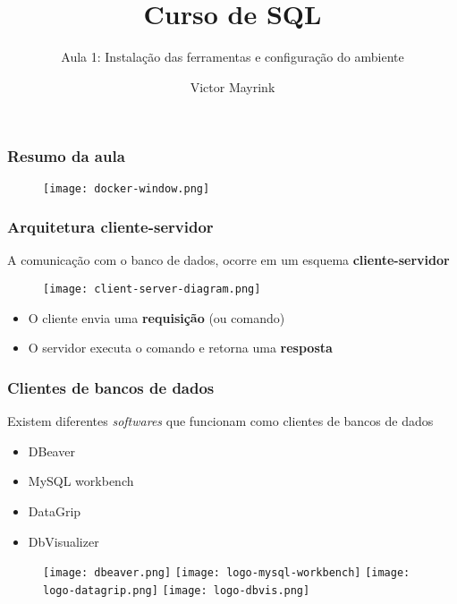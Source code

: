 \documentclass[t, 10pt, aspectratio=169, table, x11names]{beamer}
\begin{document}
	\author{Victor Mayrink}
	\title{Curso de SQL}
	\subtitle{Aula 1: Instalação das ferramentas e configuração do ambiente}

	\begin{frame}[plain]
		\maketitle
	\end{frame}
	
	\begin{frame}
		\frametitle{Resumo da aula}
		\vspace{0.5cm}
		\begin{figure}[h]
			\texttt{[image: docker-window.png]}
		\end{figure}
	\end{frame}

	\begin{frame}
		\frametitle{Arquitetura cliente-servidor}
		A comunicação com o banco de dados, ocorre em um esquema \textbf{cliente-servidor}
		\vspace{3mm}
		\begin{figure}[h]
			\texttt{[image: client-server-diagram.png]}
		\end{figure}
		\begin{itemize}
			\item O cliente envia uma \textbf{requisição} (ou comando)
			\item O servidor executa o comando e retorna uma \textbf{resposta}
		\end{itemize}
	\end{frame}
	
	\begin{frame}
		\frametitle{Clientes de bancos de dados}
		Existem diferentes \textit{softwares} que funcionam como clientes de bancos de dados
		\medskip
		\begin{itemize}
			\item DBeaver
			\item MySQL workbench
			\item DataGrip
			\item DbVisualizer
		\end{itemize}
		\begin{figure}
			\vspace{2mm}
			\centering
			\texttt{[image: dbeaver.png]}
			\hspace{10mm}
			\texttt{[image: logo-mysql-workbench]}
			\hspace{10mm}
			\texttt{[image: logo-datagrip.png]}
			\hspace{7mm}
			\texttt{[image: logo-dbvis.png]}
		\end{figure}
	\end{frame}
\end{document}
